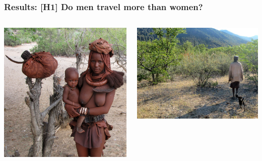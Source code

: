 \documentclass{beamer}
\begin{document}
\begin{frame}
\frametitle{Results: [H1] Do men travel more than women?}

\begin{columns}
\begin{column}{.5\textwidth}
\includegraphics[width= .8\textwidth]{dispersal}
\end{column}

\begin{column}{.5\textwidth}
\includegraphics[width= 1\textwidth]{tjokwalk}
\end{column}

\end{columns}

\end{frame}
\end{document}
